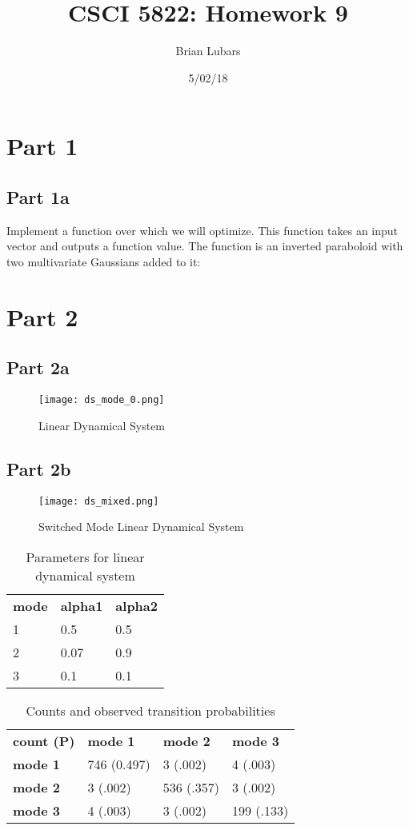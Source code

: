 \documentclass[letterpaper, 10pt]{article}
\title{CSCI 5822: Homework 9}
\author{Brian Lubars}
\date{5/02/18}
\begin{document}
\maketitle
\section{Part 1}
\subsection{Part 1a}
Implement a function over which we will optimize. This function takes an input vector and outputs a function value. 
The function is an inverted paraboloid with two multivariate Gaussians added to it:

\section{Part 2}
\subsection{Part 2a}

\begin{figure}[h!]
  \centering
  \texttt{[image: ds\_mode\_0.png]}
  \label{1}
  \caption{Linear Dynamical System}
\end{figure}

\subsection{Part 2b}

\begin{figure}[h!]
  \centering
  \texttt{[image: ds\_mixed.png]}
  \label{2}
  \caption{Switched Mode Linear Dynamical System}
\end{figure}

\begin{table}[]
\centering
\caption{Parameters for linear dynamical system}
\label{my-label}
\begin{tabular}{lll}
\textbf{mode} & \textbf{alpha1} & \textbf{alpha2} \\
1             & 0.5             & 0.5             \\
2             & 0.07            & 0.9             \\
3             & 0.1             & 0.1            
\end{tabular}
\end{table}

\begin{table}[]
\centering
\caption{Counts and observed transition probabilities}
\label{my-label}
\begin{tabular}{llll}
\textbf{count (P)} & \textbf{mode 1} & \textbf{mode 2} & \textbf{mode 3} \\
\textbf{mode 1}    & 746 (0.497)     & 3 (.002)        & 4 (.003)        \\
\textbf{mode 2}    & 3 (.002)        & 536 (.357)      & 3 (.002)        \\
\textbf{mode 3}    & 4 (.003)        & 3 (.002)        & 199 (.133)     
\end{tabular}
\end{table}
\end{document}
